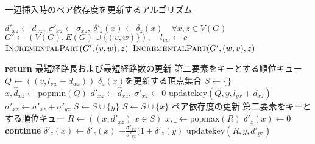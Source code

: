 \begin{algorithm}[tbp]
  \caption{一辺挿入時のペア依存度を更新するアルゴリズム}
  \label{algo:incremental-algorithm}
  \begin{algorithmic}[1]\small
    \State $d'_{xz}\gets d_{xz},\:\sigma'_{xz}\gets \sigma_{xz},\:\delta'_z(x)\gets \delta_z(x)\quad\forall x,z\in V(G)$
    \State $G'\gets(V(G),E(G)\cup\{(v,w)\}),\quad l_{vw}\gets c$
    \State $\textsc{IncrementalPart}(G',(v,w),z)$
    \Else
    \State $\textsc{IncrementalPart}(G',(w,v),z)$
    \EndIf
    \EndFor
    \EndProcedure
  \end{algorithmic}
  \vspace{-.5cm}
  \begin{multicols}{2}
    \begin{algorithmic}[1]\small
      \makeatletter
      \setcounter{ALG@line}{11}
      \makeatother
      \State \textbf{return}
      \EndIf
      \State \LeftComment 最短経路長および最短経路数の更新
      \State \LeftComment 第二要素をキーとする順位キュー
      \State $Q\gets((v,l_{vw}+d_{wz}))$
      \State \LeftComment $\delta_z(x)$を更新する頂点集合
      \State $S\gets\{\}$
      \State $x,\hat{d}_{xz}\gets\mathrm{popmin}(Q)$
      \State $d'_{xz}\gets\hat{d}_{xz},\:\sigma'_{xz}\gets 0$
      \State $\mathrm{updatekey}(Q,y,l_{yx}+d_{xz})$
      \EndIf
      \State $\sigma'_{xz}\gets\sigma'_{xz}+\sigma'_{yz}$
      \EndIf
      \State $S\gets S\cup\{y\}$
      \EndIf
      \EndFor
      \State $S\gets S\cup\{x\}$
      \EndIf
      \EndWhile
      \State \LeftComment ペア依存度の更新
      \State \LeftComment 第二要素をキーとする順位キュー
      \State $R\gets((x,d'_{xz})\vert x\in S)$
      \State $x,\_\gets\mathrm{popmax}(R)$
      \State $\delta'_z(x)\gets 0$
      \State \textbf{continue}
      \EndIf
      \State $\delta'_z(x)\gets\delta'_z(x)$
      $+\frac{\sigma'_{xz}}{\sigma'_{yz}}(1+\delta'_z(y)$
      \State $\mathrm{updatekey}(R, y, d'_{yz})$
      \EndIf
      \EndFor
      \EndWhile
      \EndProcedure
    \end{algorithmic}
  \end{multicols}
\end{algorithm}

